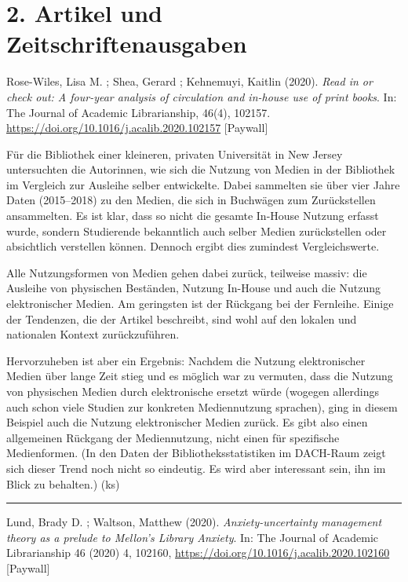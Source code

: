 \documentclass[a4paper,
fontsize=11pt,
oneside,
numbers=noperiodatend,
parskip=half-,
bibliography=totoc,
final
]{scrartcl}
\begin{document}
\hypertarget{artikel-und-zeitschriftenausgaben}{%
\section{2. Artikel und
Zeitschriftenausgaben}\label{artikel-und-zeitschriftenausgaben}}

Rose-Wiles, Lisa M. ; Shea, Gerard ; Kehnemuyi, Kaitlin (2020).
\emph{Read in or check out: A four-year analysis of circulation and
in-house use of print books}. In: The Journal of Academic Librarianship,
46(4), 102157. \url{https://doi.org/10.1016/j.acalib.2020.102157}
{[}Paywall{]}

Für die Bibliothek einer kleineren, privaten Universität in New Jersey
untersuchten die Autorinnen, wie sich die Nutzung von Medien in der
Bibliothek im Vergleich zur Ausleihe selber entwickelte. Dabei sammelten
sie über vier Jahre Daten (2015--2018) zu den Medien, die sich in
Buchwägen zum Zurückstellen ansammelten. Es ist klar, dass so nicht die
gesamte In-House Nutzung erfasst wurde, sondern Studierende bekanntlich
auch selber Medien zurückstellen oder absichtlich verstellen können.
Dennoch ergibt dies zumindest Vergleichswerte.

Alle Nutzungsformen von Medien gehen dabei zurück, teilweise massiv: die
Ausleihe von physischen Beständen, Nutzung In-House und auch die Nutzung
elektronischer Medien. Am geringsten ist der Rückgang bei der Fernleihe.
Einige der Tendenzen, die der Artikel beschreibt, sind wohl auf den
lokalen und nationalen Kontext zurückzuführen.

Hervorzuheben ist aber ein Ergebnis: Nachdem die Nutzung elektronischer
Medien über lange Zeit stieg und es möglich war zu vermuten, dass die
Nutzung von physischen Medien durch elektronische ersetzt würde (wogegen
allerdings auch schon viele Studien zur konkreten Mediennutzung
sprachen), ging in diesem Beispiel auch die Nutzung elektronischer
Medien zurück. Es gibt also einen allgemeinen Rückgang der
Mediennutzung, nicht einen für spezifische Medienformen. (In den Daten
der Bibliotheksstatistiken im DACH-Raum zeigt sich dieser Trend noch
nicht so eindeutig. Es wird aber interessant sein, ihn im Blick zu
behalten.) (ks)

\begin{center}\rule{0.5\linewidth}{0.5pt}\end{center}

Lund, Brady D. ; Waltson, Matthew (2020). \emph{Anxiety-uncertainty
management theory as a prelude to Mellon's Library Anxiety}. In: The
Journal of Academic Librarianship 46 (2020) 4, 102160,
\url{https://doi.org/10.1016/j.acalib.2020.102160} {[}Paywall{]}
\end{document}
